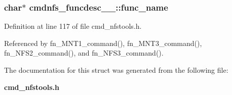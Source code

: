 \subsubsection{\setlength{\rightskip}{0pt plus 5cm}char$\ast$ {\bf cmdnfs\_\-funcdesc\_\-\_\-::func\_\-name}}\label{structcmdnfs__funcdesc_____o0}




Definition at line 117 of file cmd\_\-nfstools.h.

Referenced by fn\_\-MNT1\_\-command(), fn\_\-MNT3\_\-command(), fn\_\-NFS2\_\-command(), and fn\_\-NFS3\_\-command().

The documentation for this struct was generated from the following file:\begin{CompactItemize}
\item 
{\bf cmd\_\-nfstools.h}\end{CompactItemize}

